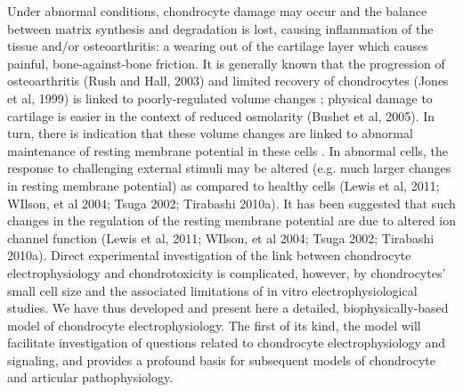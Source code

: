 Under abnormal conditions, chondrocyte damage may occur and the
balance between matrix synthesis and degradation is lost, causing
inflammation of the tissue and/or osteoarthritis: a wearing out of the
cartilage layer which causes painful, bone-against-bone friction. It
is generally known that the progression of osteoarthritis (Rush and
Hall, 2003) and limited recovery of chondrocytes (Jones et al, 1999)
is linked to poorly-regulated volume changes \citep{Lewisetal2011};
physical damage to cartilage is easier in the context of reduced
osmolarity (Bushet et al, 2005).  In turn, there is indication that
these volume changes are linked to abnormal maintenance of resting
membrane potential in these cells \citep{Lewisetal2011}.  In abnormal
cells, the response to challenging external stimuli may be altered
(e.g. much larger changes in resting membrane potential) as compared
to healthy cells (Lewis et al, 2011; WIlson, et al 2004; Tsuga 2002;
Tirabashi 2010a).  It has been suggested that such changes in the
regulation of the resting membrane potential are due to altered ion
channel function (Lewis et al, 2011; WIlson, et al 2004; Tsuga 2002;
Tirabashi 2010a).  Direct experimental investigation of the link
between chondrocyte electrophysiology and chondrotoxicity is
complicated, however, by chondrocytes' small cell size and the
associated limitations of in vitro electrophysiological studies. We
have thus developed and present here a detailed, biophysically-based
model of chondrocyte electrophysiology.  The first of its kind, the
model will facilitate investigation of questions related to
chondrocyte electrophysiology and signaling, and provides a profound
basis for subsequent models of chondrocyte and articular
pathophysiology.

